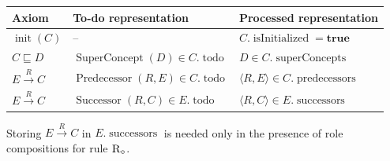 \documentclass[11pt]{article}
\newcommand{\sub}{\sqsubseteq}
\newcommand{\compose}{\circ}
\newcommand{\init}{\operatorname{init}}
\newcommand{\todo}{\operatorname{todo}}
\newcommand{\superConcepts}{\operatorname{superConcepts}}
\newcommand{\predecessors}{\operatorname{predecessors}}
\newcommand{\successors}{\operatorname{successors}}
\newcommand{\isInitialized}{\operatorname{isInitialized}}
\newcommand{\SuperConcept}{\operatorname{SuperConcept}}
\newcommand{\Predecessor}{\operatorname{Predecessor}}
\newcommand{\Successor}{\operatorname{Successor}}
\begin{document}
\begin{center}
\begin{tabular}{lll}
\toprule
\textbf{Axiom} & \textbf{To-do representation} & \textbf{Processed representation} \\
\midrule
$\init(C)$ & -- & $C.\isInitialized = \textbf{true}$ \\
$C \sub D$ & $\SuperConcept(D) \in C.\todo$ & $D \in C.\superConcepts$ \\
$E \xrightarrow{R} C$ & $\Predecessor(R,E) \in C.\todo$ & $\langle R,E\rangle \in C.\predecessors$ \\
$E \xrightarrow{R} C$ & $\Successor(R,C) \in E.\todo$ & $\langle R,C\rangle \in E.\successors$ \\
\bottomrule
\end{tabular}
\end{center}

Storing $E \xrightarrow{R} C$ in $E.\successors$ is needed only in the presence of role compositions for rule $\textsc{R}_{\compose}$.
\end{document}
